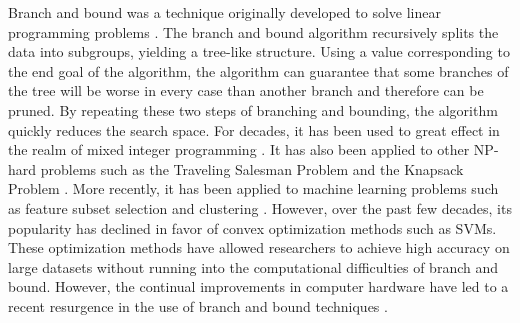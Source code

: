 Branch and bound was a technique originally developed to solve linear programming problems \cite{LandDo60}.
The branch and bound algorithm recursively splits the data into subgroups, yielding a tree-like structure.
Using a value corresponding to the end goal of the algorithm, the algorithm can guarantee that some branches of the tree will be worse in every case than another branch and therefore can be pruned.
By repeating these two steps of branching and bounding, the algorithm quickly reduces the search space.
For decades, it has been used to great effect in the realm of mixed integer programming \cite{LinderothSa99}.
It has also been applied to other NP-hard problems such as the Traveling Salesman Problem \cite{LittleMuSwKa63} and the Knapsack Problem \cite{Kolesar67}.
More recently, it has been applied to machine learning problems such as feature subset selection \cite{NarendraFu77} and clustering \cite{NarendraFu75}.
However, over the past few decades, its popularity has declined in favor of convex optimization methods such as SVMs.
These optimization methods have allowed researchers to achieve high accuracy on large datasets without running into the computational difficulties of branch and bound.
However, the continual improvements in computer hardware have led to a recent resurgence in the use of branch and bound techniques \cite{BertsimasKiMa16}.
